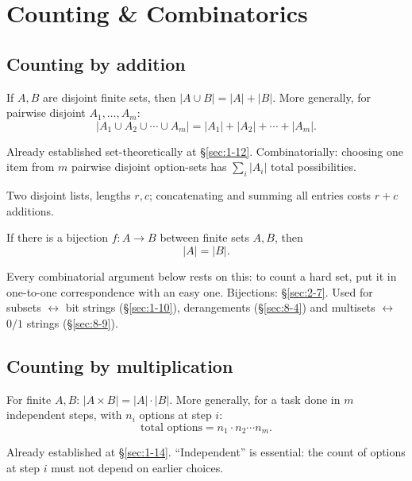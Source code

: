 \newpage
\section{Counting \& Combinatorics}

\subsection{Counting by addition}
\label{sec:8-1}

\begin{theorem}
If $A,B$ are disjoint finite sets, then $|A\cup B|=|A|+|B|$. More generally, for pairwise disjoint $A_1,\dots,A_m$:
\[
|A_1\cup A_2\cup\cdots\cup A_m| = |A_1|+|A_2|+\cdots+|A_m|.
\]
\end{theorem}
\begin{note}
Already established set-theoretically at \S\ref{sec:1-12}. Combinatorially: choosing one item from $m$ pairwise disjoint option-sets has $\sum_i|A_i|$ total possibilities.
\end{note}

\begin{example}
Two disjoint lists, lengths $r,c$; concatenating and summing all entries costs $r+c$ additions.
\end{example}

\bigskip
\begin{theorem}
\label{thm:bijectionrule}
If there is a bijection $f: A\to B$ between finite sets $A,B$, then
\[
|A| = |B|.
\]
\end{theorem}
\begin{note}
Every combinatorial argument below rests on this: to count a hard set, put it in one-to-one correspondence with an easy one. Bijections: \S\ref{sec:2-7}. Used for subsets $\leftrightarrow$ bit strings (\S\ref{sec:1-10}), derangements (\S\ref{sec:8-4}) and multisets $\leftrightarrow$ $0/1$ strings (\S\ref{sec:8-9}).
\end{note}

\subsection{Counting by multiplication}
\label{sec:8-2}

\begin{theorem}
For finite $A,B$: $|A\times B| = |A|\cdot|B|$. More generally, for a task done in $m$ independent steps, with $n_i$ options at step $i$:
\[
\text{total options} = n_1\cdot n_2\cdots n_m.
\]
\end{theorem}
\begin{note}
Already established at \S\ref{sec:1-14}. ``Independent'' is essential: the count of options at step $i$ must not depend on earlier choices.
\end{note}

